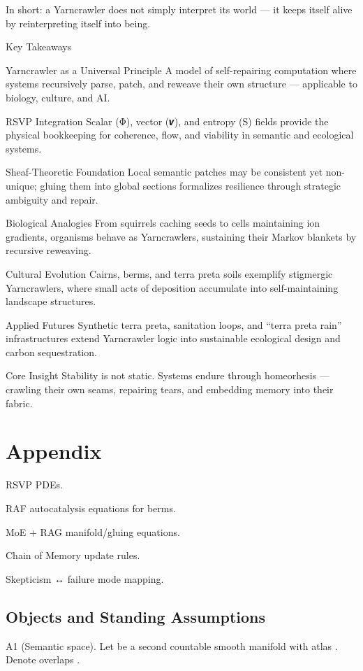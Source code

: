 \documentclass{article}
\begin{document}
In short: a Yarncrawler does not simply interpret its world — it keeps itself alive by reinterpreting itself into being.

Key Takeaways

Yarncrawler as a Universal Principle
A model of self-repairing computation where systems recursively parse, patch, and reweave their own structure — applicable to biology, culture, and AI.

RSVP Integration
Scalar (Φ), vector (𝒗), and entropy (S) fields provide the physical bookkeeping for coherence, flow, and viability in semantic and ecological systems.

Sheaf-Theoretic Foundation
Local semantic patches may be consistent yet non-unique; gluing them into global sections formalizes resilience through strategic ambiguity and repair.

Biological Analogies
From squirrels caching seeds to cells maintaining ion gradients, organisms behave as Yarncrawlers, sustaining their Markov blankets by recursive reweaving.

Cultural Evolution
Cairns, berms, and terra preta soils exemplify stigmergic Yarncrawlers, where small acts of deposition accumulate into self-maintaining landscape structures.

Applied Futures
Synthetic terra preta, sanitation loops, and “terra preta rain” infrastructures extend Yarncrawler logic into sustainable ecological design and carbon sequestration.

Core Insight
Stability is not static. Systems endure through homeorhesis — crawling their own seams, repairing tears, and embedding memory into their fabric.

\newpage
\appendix
\section{Appendix}

RSVP PDEs.

RAF autocatalysis equations for berms.

MoE + RAG manifold/gluing equations.

Chain of Memory update rules.

Skepticism ↔ failure mode mapping.

\subsection{Objects and Standing Assumptions}

A1 (Semantic space).
Let  be a second countable smooth manifold with atlas . Denote overlaps .
\end{document}
